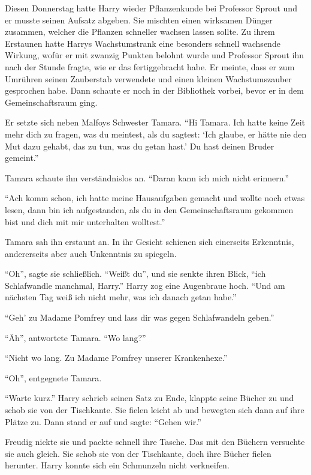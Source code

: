 \trenn

Diesen Donnerstag hatte Harry wieder Pflanzenkunde bei Professor Sprout und er musste seinen Aufsatz abgeben. Sie mischten einen wirksamen Dünger zusammen, welcher die Pflanzen schneller wachsen lassen sollte. Zu ihrem Erstaunen hatte Harrys Wachstumstrank eine besonders schnell wachsende Wirkung, wofür er mit zwanzig Punkten belohnt wurde und Professor Sprout ihn nach der Stunde fragte, wie er das fertiggebracht habe. Er meinte, dass er zum Umrühren seinen Zauberstab verwendete und einen kleinen Wachstumszauber gesprochen habe. Dann schaute er noch in der Bibliothek vorbei, bevor er in dem Gemeinschaftsraum ging.

Er setzte sich neben Malfoys Schwester Tamara. \enquote{Hi Tamara. Ich hatte keine Zeit mehr dich zu fragen, was du meintest, als du sagtest: \enquote{Ich glaube, er hätte nie den Mut dazu gehabt, das zu tun, was du getan hast.} Du hast deinen Bruder gemeint.}

Tamara schaute ihn verständnislos an. \enquote{Daran kann ich mich nicht erinnern.}

\enquote{Ach komm schon, ich hatte meine Hausaufgaben gemacht und wollte noch etwas lesen, dann bin ich aufgestanden, als du in den Gemeinschaftsraum gekommen bist und dich mit mir unterhalten wolltest.}

Tamara sah ihn erstaunt an. In ihr Gesicht schienen sich einerseits Erkenntnis, andererseits aber auch Unkenntnis zu spiegeln.

\enquote{Oh}, sagte sie schließlich. \enquote{Weißt du}, und sie senkte ihren Blick, \enquote{ich Schlafwandle manchmal, Harry.} Harry zog eine Augenbraue hoch. \enquote{Und am nächsten Tag weiß ich nicht mehr, was ich danach getan habe.}

\enquote{Geh' zu Madame Pomfrey und lass dir was gegen Schlafwandeln geben.}

\enquote{Äh}, antwortete Tamara. \enquote{Wo lang?}

\enquote{Nicht wo lang. Zu Madame Pomfrey unserer Krankenhexe.}

\enquote{Oh}, entgegnete Tamara.

\enquote{Warte kurz.} Harry schrieb seinen Satz zu Ende, klappte seine Bücher zu und schob sie von der Tischkante. Sie fielen leicht ab und bewegten sich dann auf ihre Plätze zu. Dann stand er auf und sagte: \enquote{Gehen wir.}

Freudig nickte sie und packte schnell ihre Tasche. Das mit den Büchern versuchte sie auch gleich. Sie schob sie von der Tischkante, doch ihre Bücher fielen herunter. Harry konnte sich ein Schmunzeln nicht verkneifen.

